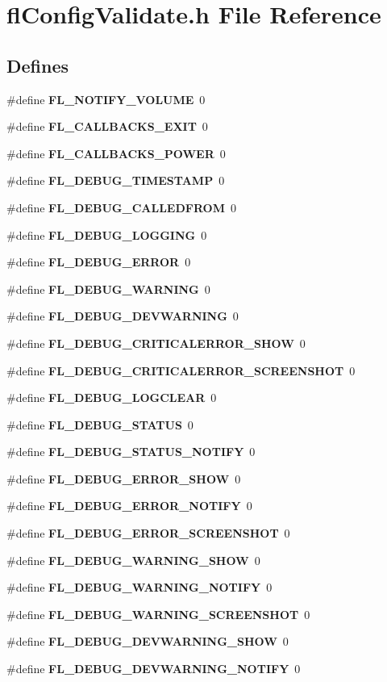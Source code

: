 \section{fl\-Config\-Validate.h File Reference}
\label{flConfigValidate_8h}
\subsection*{Defines}
\begin{CompactItemize}
\item 
\#define {\bf FL\_\-NOTIFY\_\-VOLUME}~0
\item 
\#define {\bf FL\_\-CALLBACKS\_\-EXIT}~0
\item 
\#define {\bf FL\_\-CALLBACKS\_\-POWER}~0
\item 
\#define {\bf FL\_\-DEBUG\_\-TIMESTAMP}~0
\item 
\#define {\bf FL\_\-DEBUG\_\-CALLEDFROM}~0
\item 
\#define {\bf FL\_\-DEBUG\_\-LOGGING}~0
\item 
\#define {\bf FL\_\-DEBUG\_\-ERROR}~0
\item 
\#define {\bf FL\_\-DEBUG\_\-WARNING}~0
\item 
\#define {\bf FL\_\-DEBUG\_\-DEVWARNING}~0
\item 
\#define {\bf FL\_\-DEBUG\_\-CRITICALERROR\_\-SHOW}~0
\item 
\#define {\bf FL\_\-DEBUG\_\-CRITICALERROR\_\-SCREENSHOT}~0
\item 
\#define {\bf FL\_\-DEBUG\_\-LOGCLEAR}~0
\item 
\#define {\bf FL\_\-DEBUG\_\-STATUS}~0
\item 
\#define {\bf FL\_\-DEBUG\_\-STATUS\_\-NOTIFY}~0
\item 
\#define {\bf FL\_\-DEBUG\_\-ERROR\_\-SHOW}~0
\item 
\#define {\bf FL\_\-DEBUG\_\-ERROR\_\-NOTIFY}~0
\item 
\#define {\bf FL\_\-DEBUG\_\-ERROR\_\-SCREENSHOT}~0
\item 
\#define {\bf FL\_\-DEBUG\_\-WARNING\_\-SHOW}~0
\item 
\#define {\bf FL\_\-DEBUG\_\-WARNING\_\-NOTIFY}~0
\item 
\#define {\bf FL\_\-DEBUG\_\-WARNING\_\-SCREENSHOT}~0
\item 
\#define {\bf FL\_\-DEBUG\_\-DEVWARNING\_\-SHOW}~0
\item 
\#define {\bf FL\_\-DEBUG\_\-DEVWARNING\_\-NOTIFY}~0
\item 

\end{CompactItemize}
